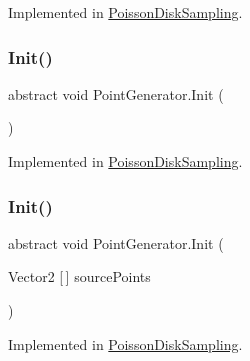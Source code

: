 Implemented in \mbox{\hyperlink{class_poisson_disk_sampling_af2aeccc94efa7d224044f730fc432bcf}{Poisson\+Disk\+Sampling}}.

\mbox{\label{class_point_generator_ae254f890c9a38d044d77f981e0dfeb68}} 
\subsubsection{\texorpdfstring{Init()}{Init()}\hspace{0.1cm}{\footnotesize\ttfamily [1/2]}}
{\footnotesize\ttfamily abstract void Point\+Generator.\+Init (\begin{DoxyParamCaption}{ }\end{DoxyParamCaption})\hspace{0.3cm}{\ttfamily [pure virtual]}}



Implemented in \mbox{\hyperlink{class_poisson_disk_sampling_a1a571483a8940424916aa1266576161e}{Poisson\+Disk\+Sampling}}.

\mbox{\label{class_point_generator_a46241ac6f86e8a9cd190bbecba41f6d1}} 
\subsubsection{\texorpdfstring{Init()}{Init()}\hspace{0.1cm}{\footnotesize\ttfamily [2/2]}}
{\footnotesize\ttfamily abstract void Point\+Generator.\+Init (\begin{DoxyParamCaption}\item[{Vector2 \mbox{[}$\,$\mbox{]}}]{source\+Points }\end{DoxyParamCaption})\hspace{0.3cm}{\ttfamily [pure virtual]}}



Implemented in \mbox{\hyperlink{class_poisson_disk_sampling_abd6053768abe24749eee699ce914eceb}{Poisson\+Disk\+Sampling}}.

\mbox{\label{class_point_generator_a91e70f9d4939dfb00755b46937e6d26b}} 
